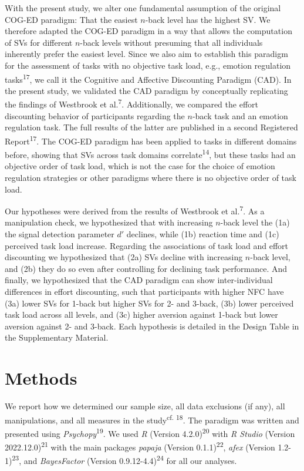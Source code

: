 \documentclass[
  man,floatsintext]{apa6}
\begin{document}
With the present study, we alter one fundamental assumption of the original COG-ED paradigm: That the easiest \(n\)-back level has the highest SV.
We therefore adapted the COG-ED paradigm in a way that allows the computation of SVs for different \(n\)-back levels without presuming that all individuals inherently prefer the easiest level.
Since we also aim to establish this paradigm for the assessment of tasks with no objective task load, e.g., emotion regulation tasks\textsuperscript{17}, we call it the Cognitive and Affective Discounting Paradigm (CAD).
In the present study, we validated the CAD paradigm by conceptually replicating the findings of Westbrook et al.\textsuperscript{7}.
Additionally, we compared the effort discounting behavior of participants regarding the \(n\)-back task and an emotion regulation task.
The full results of the latter are published in a second Registered Report\textsuperscript{17}.
The COG-ED paradigm has been applied to tasks in different domains before, showing that SVs across task domains correlate\textsuperscript{14}, but these tasks had an objective order of task load, which is not the case for the choice of emotion regulation strategies or other paradigms where there is no objective order of task load.

Our hypotheses were derived from the results of Westbrook et al.\textsuperscript{7}.
As a manipulation check, we hypothesized that with increasing \(n\)-back level the (1a) the signal detection parameter \(d'\) declines, while (1b) reaction time and (1c) perceived task load increase.
Regarding the associations of task load and effort discounting we hypothesized that (2a) SVs decline with increasing \(n\)-back level, and (2b) they do so even after controlling for declining task performance.
And finally, we hypothesized that the CAD paradigm can show inter-individual differences in effort discounting, such that participants with higher NFC have (3a) lower SVs for 1-back but higher SVs for 2- and 3-back, (3b) lower perceived task load across all levels, and (3c) higher aversion against 1-back but lower aversion against 2- and 3-back.
Each hypothesis is detailed in the Design Table in the Supplementary Material.

\hypertarget{methods}{%
\section{Methods}\label{methods}}

We report how we determined our sample size, all data exclusions (if any), all manipulations, and all measures in the study\textsuperscript{cf. 18}.
The paradigm was written and presented using \emph{Psychopy}\textsuperscript{19}.
We used \emph{R} (Version 4.2.0)\textsuperscript{20} with \emph{R Studio} (Version 2022.12.0)\textsuperscript{21} with the main packages \emph{papaja} (Version 0.1.1)\textsuperscript{22}, \emph{afex} (Version 1.2-1)\textsuperscript{23}, and \emph{BayesFactor} (Version 0.9.12-4.4)\textsuperscript{24} for all our analyses.
\end{document}
